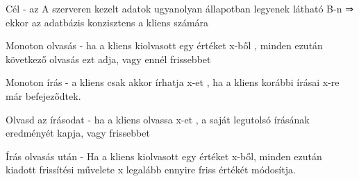 \documentclass[12pt]{article}
\begin{document}
\begin{description}
    \item Cél
        - az A szerveren kezelt adatok ugyanolyan állapotban legyenek látható B-n ⇒ ekkor az adatbázis konzisztens a kliens számára
    \item Monoton olvasás
        - ha a kliens kiolvasott egy értéket x-ből , minden ezután következő olvasás ezt adja, vagy ennél frissebbet
    \item Monoton írás
        - a kliens csak akkor írhatja x-et , ha a kliens korábbi írásai x-re már befejeződtek.
    \item Olvasd az írásodat
        - ha a kliens olvassa x-et , a saját legutolsó írásának eredményét kapja, vagy frissebbet
    \item Írás olvasás után
        - Ha a kliens kiolvasott egy értéket x-ből, minden ezután kiadott frissítési művelete x legalább ennyire friss értékét módosítja.
\end{description}
\end{document}
